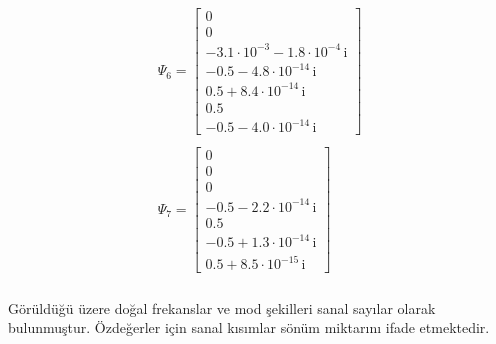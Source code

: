 \documentclass[a4paper]{report}
\begin{document}
\begin{eqnarray*}
\begin{array}{cc}
\Psi_6=\left[\begin{array}{c} 0\\ 0\\ -3.1\cdot 10^{-3} - 1.8\cdot 10^{-4}\, \mathrm{i}\\ -0.5 - 4.8\cdot 10^{-14}\, \mathrm{i}\\ 0.5 + 8.4\cdot 10^{-14}\, \mathrm{i}\\ 0.5\\ -0.5 - 4.0\cdot 10^{-14}\, \mathrm{i} \end{array}\right]\\\\
\Psi_7=\left[\begin{array}{c} 0\\ 0\\ 0\\ -0.5 - 2.2\cdot 10^{-14}\, \mathrm{i}\\ 0.5\\ -0.5 + 1.3\cdot 10^{-14}\, \mathrm{i}\\ 0.5 + 8.5\cdot 10^{-15}\, \mathrm{i} \end{array}\right]\end{array}
\end{eqnarray*}\\
Görüldüğü üzere doğal frekanslar ve mod şekilleri sanal sayılar olarak bulunmuştur. Özdeğerler için sanal kısımlar sönüm miktarını ifade etmektedir.
\end{document}
